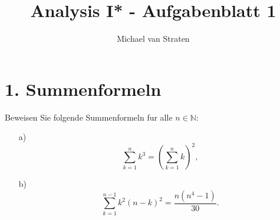 \documentclass{exam}
\title{Analysis I* - Aufgabenblatt 1}
\author{Michael van Straten}
\begin{document}
    \maketitle
    \section*{1. Summenformeln}
        Beweisen Sie folgende Summenformeln fur alle $n \in \mathbb{N}$:
        \begin{enumerate}
            \item[a)]
                \[
                    \sum_{k = 1}^{n} k^3 = \left(\sum_{k = 1}^{n}k\right)^2,
                \]
            \item[b)]
                \[
                    \sum_{k = 1}^{n-1} k^2(n-k)^2 = \frac{n(n^4-1)}{30}.
                \]
        \end{enumerate}
\end{document}
